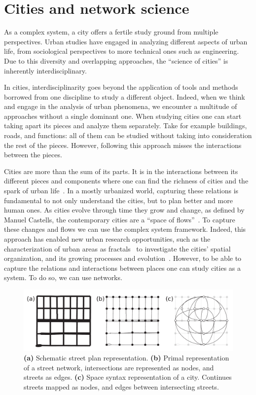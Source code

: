 \section{Cities and network science}


As a complex system, a city offers a fertile study ground from multiple perspectives. Urban studies have engaged in analyzing different aspects of urban life, from sociological perspectives to more technical ones such as engineering. Due to this diversity and overlapping approaches, the ``science of cities'' is inherently interdisciplinary.

In cities, interdisciplinarity goes beyond the application of tools and methods borrowed from one discipline to study a different object. Indeed, when we think and engage in the analysis of urban phenomena, we encounter a multitude of approaches without a single dominant one. When studying cities one can start taking apart its pieces and analyze them separately. Take for example buildings, roads, and functions: all of them can be studied without taking into consideration the rest of the pieces. However, following this approach misses the interactions between the pieces. 

Cities are more than the sum of its parts. It is in the interactions between its different pieces and components where one can find the richness of cities and the spark of urban life~\cite{Jacobs1961Death}. In a mostly urbanized world, capturing these relations is fundamental to not only understand the cities, but to plan better and more human ones. As cities evolve through time they grow and change, as defined by Manuel Castells, the contemporary cities are a ``space of flows''~\cite{castells1989informational}. To capture these changes and flows we can use the complex system framework. Indeed, this approach has enabled new urban research opportunities, such as the characterization of urban areas as fractals~\cite{batty1996preliminary} to investigate the cities' spatial organization, and its growing processes and evolution~\cite{makse1995growth}. However, to be able to capture the relations and interactions between places one can study cities as a system. To do so, we can use networks.

\begin{figure}[th!]
	\centering
	\includegraphics[width=\textwidth]{images/introduction/networks.pdf}
	\caption[Network representation of a city]{\textbf{(a)} Schematic street plan representation. \textbf{(b)} Primal representation of a street network, intersections are represented as nodes, and streets as edges. \textbf{(c)} Space syntax representation of a city. Continues streets mapped as nodes, and edges between intersecting streets.}
	\label{fig:networks}
\end{figure}


